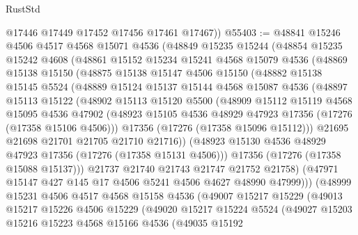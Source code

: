 \begin{lexlean}{RustStd}
\begin{coremodule}
        @17446
        @17449
        @17452
        @17456
        @17461
        @17467))
@55403 := @48841
    @15246
    @4506
    @4517
    @4568
    @15071
    @4536
    (@48849
      @15235
      @15244
      (@48854
        @15235
        @15242
        @4608
        (@48861
          @15152
          @15234
          @15241
          @4568
          @15079
          @4536
          (@48869
            @15138
            @15150
            (@48875
              @15138
              @15147
              @4506
              @15150
              (@48882
                @15138
                @15145
                @5524
                (@48889
                  @15124
                  @15137
                  @15144
                  @4568
                  @15087
                  @4536
                  (@48897
                    @15113
                    @15122
                    (@48902
                      @15113
                      @15120
                      @5500
                      (@48909
                        @15112
                        @15119
                        @4568
                        @15095
                        @4536
                        @47902
                        (@48923 @15105 @4536 @48929 @47923 @17356 (@17276 (@17358 @15106 @4506)))
                        @17356
                        (@17276 (@17358 @15096 @15112)))
                      @21695
                      @21698
                      @21701
                      @21705
                      @21710
                      @21716))
                  (@48923 @15130 @4536 @48929 @47923 @17356 (@17276 (@17358 @15131 @4506)))
                  @17356
                  (@17276 (@17358 @15088 @15137)))
                @21737
                @21740
                @21743
                @21747
                @21752
                @21758)
              (@47971 @15147 @427 @145 @17 @4506 @5241 @4506 @4627 @48990 @47999)))
          (@48999
            @15231
            @4506
            @4517
            @4568
            @15158
            @4536
            (@49007
              @15217
              @15229
              (@49013
                @15217
                @15226
                @4506
                @15229
                (@49020
                  @15217
                  @15224
                  @5524
                  (@49027
                    @15203
                    @15216
                    @15223
                    @4568
                    @15166
                    @4536
                    (@49035
                      @15192

\end{coremodule}
\end{lexlean}
